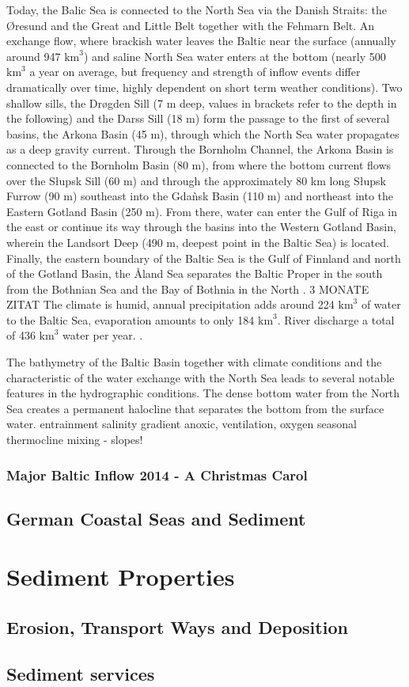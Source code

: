 Today, the Balic Sea is connected to the North Sea via the Danish Straits: the \O resund and the Great and Little Belt together with the Fehmarn Belt. An exchange flow, where brackish water leaves the Baltic near the surface (annually around 947 $\text{km}^3$) and saline North Sea water enters at the bottom (nearly 500 $\text{km}^3$ a year on average, but frequency and strength of inflow events differ dramatically over time, highly dependent on short term weather conditions). Two shallow sills, the Dr\o gden Sill (7 m deep, values in brackets refer to the depth in the following) and the Darss Sill (18 m) form the passage to the first of several basins, the Arkona Basin (45 m), through which the North Sea water propagates as a deep gravity current. Through the Bornholm Channel, the Arkona Basin is connected to the Bornholm Basin (80 m), from where the bottom current flows over the S\l upsk Sill (60 m) and through the approximately 80 km long S\l upsk Furrow (90 m) southeast into the Gda\`{n}sk Basin (110 m) and northeast into the Eastern Gotland Basin (250 m). From there, water can enter the Gulf of Riga in the east or continue its way through the basins into the Western Gotland Basin, wherein the Landsort Deep (490 m, deepest point in the Baltic Sea) is located. Finally, the eastern boundary of the Baltic Sea is the Gulf of Finnland and north of the Gotland Basin, the \r{A}land Sea separates the Baltic Proper in the south from the Bothnian Sea and the Bay of Bothnia in the North \citep[][]{reissmann2009}. 3 MONATE ZITAT  The climate is humid, annual precipitation adds around 224 $\text{km}^3$ of water to the Baltic Sea, evaporation amounts to only 184 $\text{km}^3$. River discharge a total of 436 $\text{km}^3$ water per year. \citep[][]{reissmann2009}.

The bathymetry of the Baltic Basin together with climate conditions and the characteristic of the water exchange with the North Sea leads to several notable features in the hydrographic conditions. The dense bottom water from the North Sea creates a permanent halocline that separates the bottom from the surface water. 
entrainment
salinity gradient
anoxic, ventilation, oxygen
seasonal thermocline
mixing - slopes!

\subsubsection{Major Baltic Inflow 2014 - A Christmas Carol}

\subsection{German Coastal Seas and Sediment}

\section{Sediment Properties}

\subsection{Erosion, Transport Ways and Deposition}

\subsection{Sediment services}

